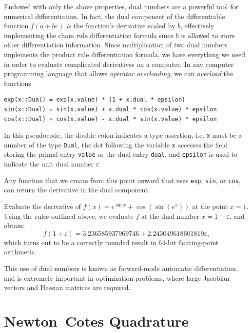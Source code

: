Endowed with only the above properties, dual numbers are a powerful tool for numerical differentiation. In fact, the dual component of the differentiable function $f(a+b\varepsilon)$ {\em is} the function's derivative scaled by $b$, effectively implementing the chain rule differentiation formula since $b$ is allowed to store other differentiation information. Since multiplication of two dual numbers implements the product rule differentiation formula, we have everything we need in order to evaluate complicated derivatives on a computer. In any computer programming language that allows {\em operator overloading}, we can {\em overload} the functions 
\begin{verbatim}
exp(x::Dual) = exp(x.value) * (1 + x.dual * epsilon)
sin(x::Dual) = sin(x.value) + x.dual * cos(x.value) * epsilon
cos(x::Dual) = cos(x.value) - x.dual * sin(x.value) * epsilon
\end{verbatim}
In this pseudocode, the double colon indicates a type assertion, i.e. \verb+x+ must be a number of the type \verb+Dual+, the dot following the variable \verb+x+ accesses the field storing the primal entry \verb+value+ or the dual entry \verb+dual+, and \verb+epsilon+ is used to indicate the unit dual number $\varepsilon$.

Any function that we create from this point onward that uses \verb+exp+, \verb+sin+, or \verb+cos+, can return the derivative in the dual component.

\begin{example}
Evaluate the derivative of $f(x) = e^{\sin x} + \cos(\sin(e^x))$ at the point $x=1$. Using the rules outlined above, we evaluate $f$ at the dual number $x = 1 + \varepsilon$, and obtain:
\[
f(1+\varepsilon) = 3.236585937969746 + 2.243049618601819\varepsilon,
\]
which turns out to be a correctly rounded result in 64-bit floating-point arithmetic.
\end{example}

This use of dual numbers is known as forward-mode automatic differentiation, and is extremely important in optimization problems, where large Jacobian vectors and Hessian matrices are required.

\section{Newton--Cotes Quadrature}

